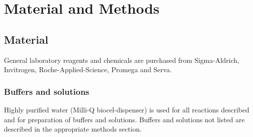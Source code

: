 \chapter{Material and Methods} \label{ch:mm}

\section{Material}

General laboratory reagents and chemicals are purchased from Sigma-Aldrich, Invitrogen, Roche-Applied-Science, Promega and Serva.

\subsection{Buffers and solutions}

Highly purified water (Milli-Q biocel-dispenser) is used for all reactions described and for preparation of buffers and solutions. Buffers and solutions not listed are described in the appropriate methods section.

